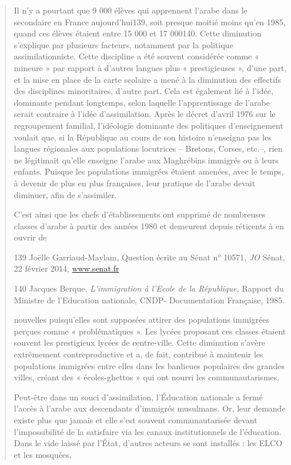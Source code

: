 \begin{quote}
Il n'y a pourtant que 9 000 élèves qui apprennent l'arabe dans le
secondaire en France aujourd'hui139, soit presque moitié moins qu'en
1985, quand ces élèves étaient entre 15 000 et 17 000140. Cette
diminution s'explique par plusieurs facteurs, notamment par la politique
assimilationniste. Cette discipline a été souvent considérée comme «
mineure » par rapport à d'autres langues plus « prestigieuses », d'une
part, et la mise en place de la carte scolaire a mené à la diminution
des effectifs des disciplines minoritaires, d'autre part. Cela est
également lié à l'idée, dominante pendant longtemps, selon laquelle
l'apprentissage de l'arabe serait contraire à l'idée d'assimilation.
Après le décret d'avril 1976 sur le regroupement familial, l'idéologie
dominante des politiques d'enseignement voulait que, si la République au
cours de son histoire n'enseigna pas les langues régionales aux
populations locutrices -- Bretons, Corses, etc.--, rien ne légitimait
qu'elle enseigne l'arabe aux Maghrébins immigrés ou à leurs enfants.
Puisque les populations immigrées étaient amenées, avec le temps, à
devenir de plus en plus françaises, leur pratique de l'arabe devait
diminuer, afin de s'assimiler.

C'est ainsi que les chefs d'établissements ont supprimé de nombreuses
classes d'arabe à partir des années 1980 et demeurent depuis réticents à
en ouvrir de

139 Joëlle Garriaud-Maylam, Question écrite au Sénat n° 10571, \emph{JO}
Sénat, 22 février 2014, \href{http://www.senat.fr/}{www.senat.fr}

140 Jacques Berque, \emph{L'immigration à l'Ecole de la République,}
Rapport du Ministre de l'Education nationale, CNDP- Documentation
Française, 1985.



nouvelles puisqu'elles sont supposées attirer des populations immigrées
perçues comme « problématiques ». Les lycées proposant ces classes
étaient souvent les prestigieux lycées de centre-ville. Cette diminution
s'avère extrêmement contreproductive et a, de fait, contribué à
maintenir les populations immigrées entre elles dans les banlieues
populaires des grandes villes, créant des « écoles-ghettos » qui ont
nourri les communautarismes.

Peut-être dans un souci d'assimilation, l'Éducation nationale a fermé
l'accès à l'arabe aux descendants d'immigrés musulmans. Or, leur demande
existe plus que jamais et elle s'est souvent communautarisée devant
l'impossibilité de la satisfaire via les canaux institutionnels de
l'éducation. Dans le vide laissé par l'État, d'autres acteurs se sont
installés : les ELCO et les mosquées.
\end{quote}

